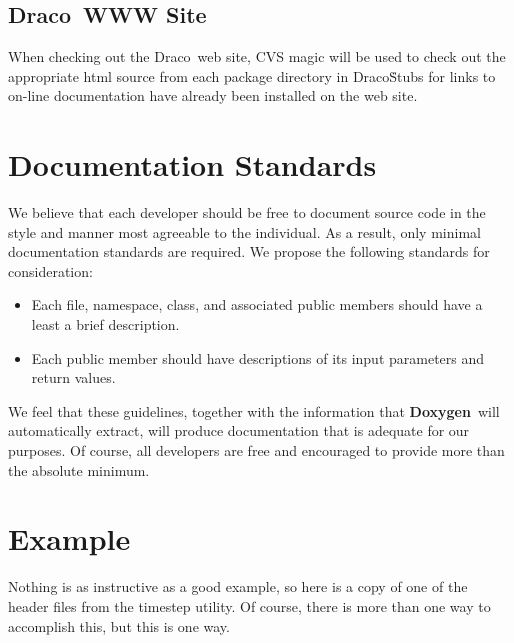 \documentclass[11pt]{nmemo}
\newcommand{\draco}{{\normalfont\sffamily Draco}}
\newcommand{\doxy}{{\normalfont\bfseries Doxygen}}
\begin{document}
  \subsection{\draco\ WWW Site}
When checking out the \draco\ web site,
CVS magic will be used to check out the appropriate html source
from each package directory in \draco\. Stubs for links to on-line 
documentation have already been installed on the web site.

\section{Documentation Standards}

We believe that each developer should be free to document source code
in the style and manner most agreeable to the individual. As a result,
only minimal documentation standards are required.
We propose the following standards for consideration:

\begin{itemize}
\item Each file, namespace, class,  and associated public members should have 
a least a brief description.
\item Each public member should have descriptions of its input parameters and
return values.
\end{itemize}

We feel that these guidelines, together with the information that
\doxy\ will automatically
extract, will produce documentation that is adequate for our purposes. Of
course, all developers are free and encouraged to provide more than the
absolute minimum.

\section{Example}
Nothing is as instructive as a good example, so here is a copy of
one of the header files from the timestep utility. Of course,
there is more than one way to accomplish this, but this is one way.
\end{document}
